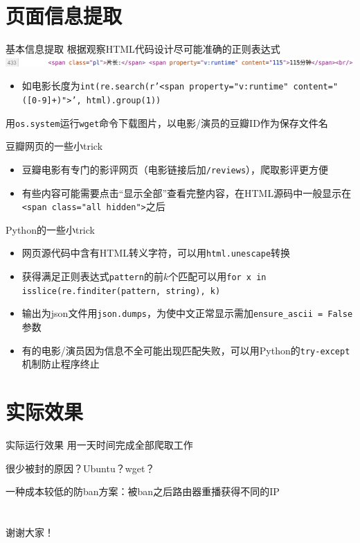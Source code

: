 \documentclass{ctexbeamer}
\begin{document}
\section{页面信息提取}
\begin{frame}{基本信息提取}
	根据观察HTML代码设计尽可能准确的正则表达式
	\includegraphics[width=\textwidth]{duration.png}
	\vspace{-4ex}
	\begin{itemize}
		\item 如电影长度为\texttt{int(re.search(r'<span property="v:runtime" content="([0-9]+)">', html).group(1))}
	\end{itemize}
	用\texttt{os.system}运行\texttt{wget}命令下载图片，以电影/演员的豆瓣ID作为保存文件名
\end{frame}
\begin{frame}{豆瓣网页的一些小trick}
	\begin{itemize}
		\item 豆瓣电影有专门的影评网页（电影链接后加\texttt{/reviews}），爬取影评更方便
		\pause \item 有些内容可能需要点击“显示全部”查看完整内容，在HTML源码中一般显示在\texttt{<span class="all hidden">}之后
	\end{itemize}
\end{frame}
\begin{frame}{Python的一些小trick}
	\begin{itemize}
		\item 网页源代码中含有HTML转义字符，可以用\texttt{html.unescape}转换
		\pause \item 获得满足正则表达式\texttt{pattern}的前$k$个匹配可以用\texttt{for x in isslice(re.finditer(pattern, string), k)}
		\pause \item 输出为json文件用\texttt{json.dumps}，为使中文正常显示需加\texttt{ensure\_ascii = False}参数
		\pause \item 有的电影/演员因为信息不全可能出现匹配失败，可以用Python的\texttt{try-except}机制防止程序终止
	\end{itemize}
\end{frame}
\section{实际效果}
\begin{frame}{实际运行效果}
	用一天时间完成全部爬取工作 \par \vspace{1ex}
	\pause 很少被封的原因？Ubuntu？wget？ \par \vspace{1ex}
	\pause 一种成本较低的防ban方案：被ban之后路由器重播获得不同的IP
\end{frame}
\section*{}
\begin{frame}
	\centering \Huge 谢谢大家！
\end{frame}
\end{document}
